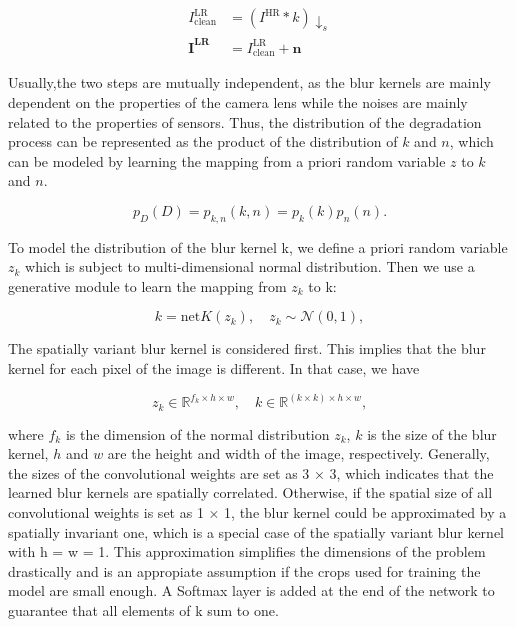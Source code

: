     \begin{equation}
        \begin{aligned}
                I^{\text{LR}}_{\text{clean}} &= (I^{\text{HR}} * k) \downarrow_s \\
                \mathbf{I^{\text{LR}}} &= I^{\text{LR}}_{\text{clean}} + \mathbf{n}
        \end{aligned}
    \end{equation}
    
    Usually,the two steps are mutually independent, as the blur kernels are mainly dependent on the properties of the camera lens while the noises are mainly related to the properties of sensors. 
    Thus, the distribution of the degradation process can be represented as the product of the distribution of $k$ and $n$, which can be modeled by learning the mapping from a priori random variable $z$ to $k$ and $n$.


    \begin{equation}
        p_{D}(D) = p_{k,n}(k, n) = p_{k}(k)p_{n}(n).
    \end{equation}

    To model the distribution of the blur kernel k, we define a priori random variable $z_k$ which is subject to multi-dimensional normal distribution. 
    Then we use a generative module to learn the mapping from $z_k$ to k: 

    \begin{equation}
        k = \text{net}K(z_k), \quad z_k \sim \mathcal{N}(0,1),
    \end{equation}

    The spatially variant blur kernel is considered first. This implies that the blur kernel for each pixel of the image is different. In that case, we have

    \begin{equation}
        z_k \in \mathbb{R}^{f_k \times h \times w}, \quad k \in \mathbb{R}^{(k \times k) \times h \times w},
    \end{equation}

    where $f_k$ is the dimension of the normal distribution $z_k$, $k$ is the size of the blur kernel, $h$ and $w$ are the height and width of the image, respectively.
    Generally, the sizes of the convolutional weights  are set as 3 × 3, which indicates that the learned blur kernels are spatially correlated.
    Otherwise, if the spatial size of all convolutional weights is set as 1 × 1, the blur kernel could be approximated by a spatially invariant one, which is a special case of the spatially variant blur kernel with h = w = 1.
    This approximation simplifies the dimensions of the problem drastically and is an appropiate assumption if the crops used for training the model are small enough.
    A Softmax layer is added at the end of the network to guarantee that all elements of k sum to one.
    
